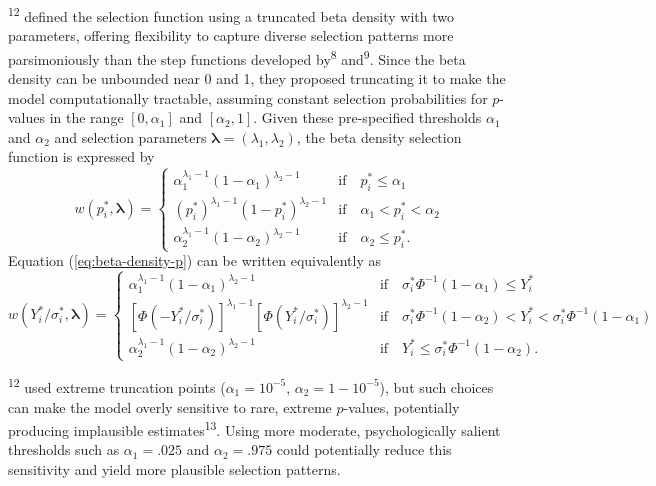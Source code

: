 \documentclass[
  american,
  man, donotrepeattitle,floatsintext]{apa7}
\begin{document}
\textsuperscript{12} defined the selection function using a truncated beta density with two parameters, offering flexibility to capture diverse selection patterns more parsimoniously than the step functions developed by\textsuperscript{8} and\textsuperscript{9}. Since the beta density can be unbounded near 0 and 1, they proposed truncating it to make the model computationally tractable, assuming constant selection probabilities for \(p\)-values in the range \([0, \alpha_1]\) and \([\alpha_2, 1]\). Given these pre-specified thresholds \(\alpha_1\) and \(\alpha_2\) and selection parameters \(\boldsymbol\lambda = (\lambda_1, \lambda_2)\), the beta density selection function is expressed by
\begin{equation}
\label{eq:beta-density-p}
w(p^*_i, \boldsymbol\lambda) =  \begin{cases} 
\alpha_1^{\lambda_1 - 1} (1 - \alpha_1)^{\lambda_2 - 1} & \text{if} \quad p^*_i \leq \alpha_1 \\
\left(p^*_i\right)^{\lambda_1 - 1} (1 - p^*_i)^{\lambda_2 - 1} & \text{if} \quad \alpha_1 < p^*_i < \alpha_2 \\
\alpha_2^{\lambda_1 - 1} (1 - \alpha_2)^{\lambda_2 - 1} & \text{if} \quad \alpha_2 \leq p^*_i.
\end{cases}
\end{equation}
Equation (\ref{eq:beta-density-p}) can be written equivalently as
\begin{equation}
\label{eq:beta-density-y}
w(Y^*_i / \sigma^*_i, \boldsymbol\lambda) =  \begin{cases} 
\alpha_1^{\lambda_1 - 1} (1 - \alpha_1)^{\lambda_2 - 1} & \text{if} \quad \sigma^*_i \Phi^{-1}(1 - \alpha_1) \leq Y^*_i \\
\left[\Phi\left(-Y^*_i / \sigma^*_i\right)\right]^{\lambda_1 - 1} \left[\Phi\left(Y^*_i / \sigma^*_i\right)\right]^{\lambda_2 - 1} & \text{if} \quad \sigma^*_i \Phi^{-1}(1 - \alpha_2) < Y^*_i < \sigma^*_i \Phi^{-1}(1 - \alpha_1) \\
\alpha_2^{\lambda_1 - 1} (1 - \alpha_2)^{\lambda_2 - 1} & \text{if} \quad  Y^*_i \leq \sigma^*_i \Phi^{-1}(1 - \alpha_2).
\end{cases}
\end{equation}

\textsuperscript{12} used extreme truncation points (\(\alpha_1 = 10^{-5}\), \(\alpha_2 = 1 - 10^{-5}\)), but such choices can make the model overly sensitive to rare, extreme \(p\)-values, potentially producing implausible estimates\textsuperscript{13}. Using more moderate, psychologically salient thresholds such as \(\alpha_1 = .025\) and \(\alpha_2 = .975\) could potentially reduce this sensitivity and yield more plausible selection patterns.
\end{document}
